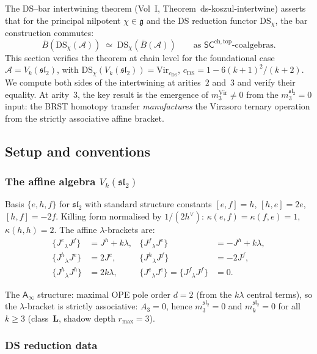 \documentclass[11pt]{article}
\newcommand{\cA}{\mathcal{A}}
\newcommand{\fg}{\mathfrak{g}}
\newcommand{\fsl}{\mathfrak{sl}}
\newcommand{\barB}{\overline{B}}
\newcommand{\Ainf}{\mathsf{A}_{\infty}}
\newcommand{\SCchtop}{\mathsf{SC}^{\mathrm{ch,top}}}
\begin{document}
The DS--bar intertwining theorem (Vol~I,
Theorem~ds-koszul-intertwine) asserts that for the principal
nilpotent $\chi \in \fg$ and the DS reduction functor
$\mathrm{DS}_\chi$, the bar construction commutes:
\[
\barB(\mathrm{DS}_\chi(\cA))
\;\simeq\;
\mathrm{DS}_\chi(\barB(\cA))
\qquad
\text{as } \SCchtop\text{-coalgebras.}
\]
This section verifies the theorem at chain level for the
foundational case $\cA = V_k(\fsl_2)$, with
$\mathrm{DS}_\chi(V_k(\fsl_2)) = \mathrm{Vir}_{c_{\mathrm{DS}}}$,
$c_{\mathrm{DS}} = 1 - 6(k+1)^2/(k+2)$.  We compute both sides of
the intertwining at arities~$2$ and~$3$ and verify their
equality.  At arity~$3$, the key result is the emergence of
$m_3^{\mathrm{Vir}} \ne 0$ from the $m_3^{\fsl_2} = 0$ input:
the BRST homotopy transfer \emph{manufactures} the Virasoro
ternary operation from the strictly associative affine bracket.

\subsection{Setup and conventions}

\subsubsection*{The affine algebra $V_k(\fsl_2)$}

Basis $\{e, h, f\}$ for $\fsl_2$ with standard structure
constants $[e,f] = h$, $[h,e] = 2e$, $[h,f] = -2f$.
Killing form normalised by $1/(2h^\vee)$: $\kappa(e,f)
= \kappa(f,e) = 1$, $\kappa(h,h) = 2$.  The affine
$\lambda$-brackets are:
\begin{equation}\label{eq:wn-ds-affine-brackets}
\begin{aligned}
\{J^e{}_\lambda J^f\} &= J^h + k\lambda, &
\{J^f{}_\lambda J^e\} &= -J^h + k\lambda, \\
\{J^h{}_\lambda J^e\} &= 2J^e, &
\{J^h{}_\lambda J^f\} &= -2J^f, \\
\{J^h{}_\lambda J^h\} &= 2k\lambda, &
\{J^e{}_\lambda J^e\} = \{J^f{}_\lambda J^f\} &= 0.
\end{aligned}
\end{equation}

The $\Ainf$ structure: maximal OPE pole order $d = 2$
(from the $k\lambda$ central terms), so the $\lambda$-bracket
is strictly associative: $A_3 = 0$, hence
$m_3^{\fsl_2} = 0$ and $m_k^{\fsl_2} = 0$ for all
$k \ge 3$ (class~$\mathbf{L}$, shadow depth $r_{\max} = 3$).

\subsubsection*{DS reduction data}
\end{document}
